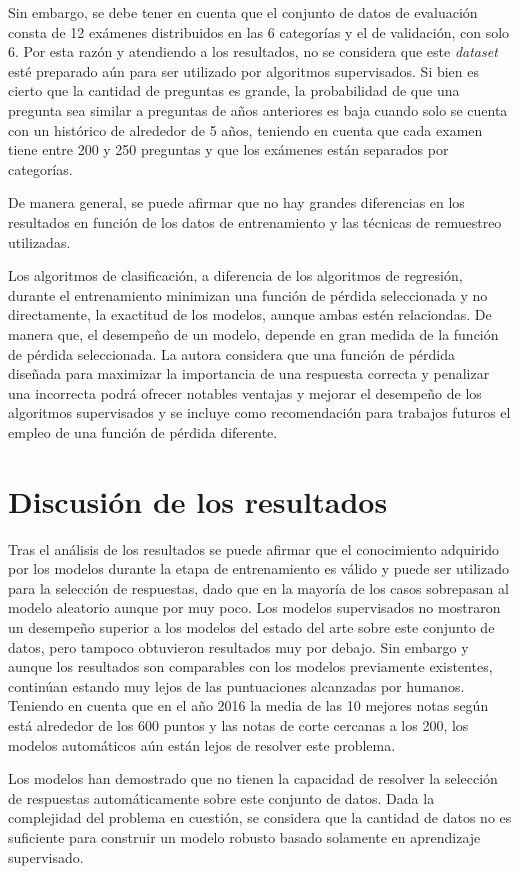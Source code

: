 Sin embargo, se debe tener en cuenta que el conjunto de datos de evaluación consta de 12 exámenes distribuidos en las 6 categorías y el de validación, con solo 6. Por esta razón y atendiendo a los resultados, no se considera que este \textit{dataset} esté preparado aún para ser utilizado por algoritmos supervisados. Si bien es cierto que la cantidad de preguntas es grande, la probabilidad de que una pregunta sea similar a preguntas de años anteriores es baja cuando solo se cuenta con un histórico de alrededor de 5 años, teniendo en cuenta que cada examen tiene entre 200 y 250 preguntas y que los exámenes están separados por categorías.

De manera general, se puede afirmar que no hay grandes diferencias en los resultados en función de los datos de entrenamiento y las técnicas de remuestreo utilizadas. 

Los algoritmos de clasificación, a diferencia de los algoritmos de regresión, durante el entrenamiento minimizan una función de pérdida seleccionada y no directamente, la exactitud de los modelos, aunque ambas estén relaciondas. De manera que, el desempeño de un modelo, depende en gran medida de la función de pérdida seleccionada. La autora considera que una función de pérdida diseñada para maximizar la importancia de una respuesta correcta y penalizar una incorrecta podrá ofrecer notables ventajas y mejorar el desempeño de los algoritmos supervisados y se incluye como recomendación para trabajos futuros el empleo de una función de pérdida diferente.

\section{Discusión de los resultados}

Tras el análisis de los resultados se puede afirmar que el conocimiento adquirido por los modelos durante la etapa de entrenamiento es válido y puede ser utilizado para la selección de respuestas, dado que en la mayoría de los casos sobrepasan al modelo aleatorio aunque por muy poco. Los modelos supervisados no mostraron un desempeño superior a los modelos del estado del arte sobre este conjunto de datos, pero tampoco obtuvieron resultados muy por debajo. Sin embargo y aunque los resultados son comparables con los modelos previamente existentes, continúan estando muy lejos de las puntuaciones alcanzadas por humanos. Teniendo en cuenta que en el año 2016 la media de las 10 mejores notas según \cite{2019-head-qa} está alrededor de los 600 puntos y las notas de corte cercanas a los 200, los modelos automáticos aún están lejos de resolver este problema.

Los modelos han demostrado que no tienen la capacidad de resolver la selección de respuestas automáticamente sobre este conjunto de datos. Dada la complejidad del problema en cuestión, se considera que la cantidad de datos no es suficiente para construir un modelo robusto basado solamente en aprendizaje supervisado. 